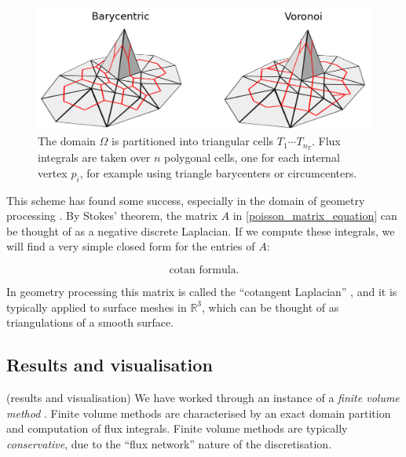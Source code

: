\begin{figure}[H]
    \begin{center}
        \includegraphics[width=0.7\linewidth]{figures/cell.png}
    \end{center}
    \caption{\scriptsize
        The domain $\Omega$ is partitioned into triangular cells $T_1\cdots T_{n_T}$.
        Flux integrals are taken over $n$ polygonal cells, one for each internal vertex $p_i$, for example using triangle barycenters or circumcenters.
    }
    \label{cell_decompositions}
\end{figure}

This scheme has found some success, especially in the domain of geometry processing \cite{polygon_mesh_processing}.
By Stokes' theorem, the matrix $A$ in \eqref{poisson_matrix_equation} can be thought of as a negative discrete Laplacian.
If we compute these integrals, we will find a very simple closed form for the entries of $A$:

$$\text{cotan formula.}$$

In geometry processing this matrix is called the ``cotangent Laplacian'' \cite{polygon_mesh_processing}, and it is typically
applied to surface meshes in $\mathbb{R}^3$, which can be thought of as triangulations of a smooth surface.

\subsection{Results and visualisation}
\vskip 0.2in
(results and visualisation)
\vskip 0.2in
We have worked through an instance of a \textit{finite volume method} \cite{pde_larsson}.
Finite volume methods are characterised by an exact domain partition and computation of flux integrals.
Finite volume methods are typically \textit{conservative}, due to the ``flux network'' nature of the discretisation.
